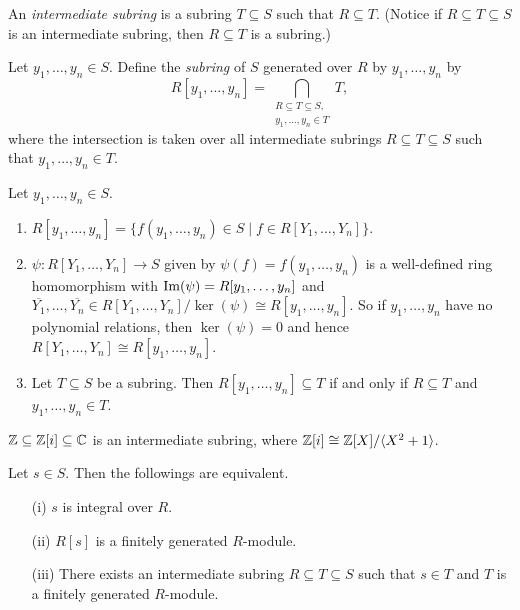 \begin{definition}\label{5.10}
    An \emph{intermediate subring} is a subring $T \subseteq S$ such that $R \subseteq T$. (Notice if $R \subseteq T \subseteq S$ is an intermediate subring, then $R \subseteq T$ is a subring.) \par
    Let $y_1,\ldots,y_n \in S$. Define the \emph{subring} of $S$ generated over $R$ by $y_1,\ldots,y_n$ by
    \[R[y_1,\ldots,y_n] = \bigcap_{\substack{R \subseteq T \subseteq S, \\ y_1,\ldots,y_n \in T}}T,\]
    where the intersection is taken over all intermediate subrings $R \subseteq T \subseteq S$ such that $y_1,\ldots,y_n \in T$. \par
\end{definition}

\begin{fact}\label{5.11}
    Let $y_1,\ldots,y_n \in S$.
    \begin{enumerate}
        \item $R[y_1,\ldots,y_n] = \{f(y_1,\ldots,y_n) \in S \mid f \in R[Y_1,\ldots,Y_n]\}$.
        \item $\psi: R[Y_1,\ldots,Y_n] \to S$ given by $\psi(f) = f(y_1,\ldots,y_n)$ is a well-defined ring homomorphism with $\operatorname{Im}(\psi) = R[y_1,\ldots,y_n]$ and $\overbar{Y_1},\ldots,\overbar {Y_n} \in R[Y_1,\ldots,Y_n]/\ker(\psi) \cong R[y_1,\ldots,y_n]$. So if $y_1,\ldots,y_n$ have no polynomial relations, then $\ker(\psi) = 0$ and hence $R[Y_1,\ldots,Y_n] \cong R[y_1,\ldots,y_n]$.
        \item Let $T \subseteq S$ be a subring. Then $R[y_1,\ldots,y_n] \subseteq T$ if and only if $R \subseteq T$ and $y_1,\ldots,y_n \in T$.
    \end{enumerate}
\end{fact}

\begin{example}\label{5.12}
    $\mathbb{Z} \subseteq \mathbb{Z}[i] \subseteq \mathbb{C}$ is an intermediate subring, where $\mathbb{Z}[i] \cong \mathbb{Z}[X]/\langle X^{2}+1 \rangle$.
\end{example}

\begin{proposition}\label{5.13}
    Let $s \in S$. Then the followings are equivalent. 
    \begin{enumerate}
        \item[(i)] $s$ is integral over $R$.
        \item[(ii)] $R[s]$ is a finitely generated $R$-module.
        \item[(iii)] There exists an intermediate subring $R \subseteq T \subseteq S$ such that $s \in T$ and $T$ is a finitely generated $R$-module.
    \end{enumerate}
\end{proposition}

